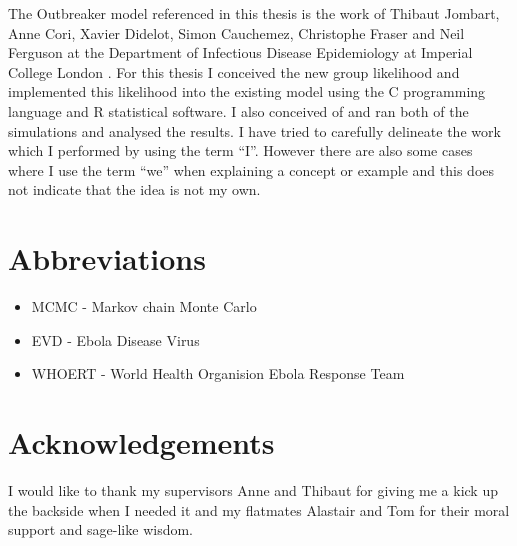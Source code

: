 \documentclass[11pt,a4paper]{report}
\begin{document}
The Outbreaker model referenced in this thesis is the work of Thibaut Jombart, Anne Cori, Xavier Didelot, Simon Cauchemez, Christophe Fraser and Neil Ferguson at the Department of Infectious Disease Epidemiology at Imperial College London \citep{outbrkr}. For this thesis I conceived the new group likelihood and implemented this likelihood into the existing model using the C programming language and R statistical software. I also conceived of and ran both of the simulations and analysed the results. I have tried to carefully delineate the work which I performed by using the term ``I''. However there are also some cases where I use the term ``we'' when explaining a concept or example and this does not indicate that the idea is not my own.
\chapter*{Abbreviations}
\begin{itemize}
\item MCMC - Markov chain Monte Carlo
\item EVD - Ebola Disease Virus
\item WHOERT - World Health Organision Ebola Response Team

\end{itemize} 
\newpage

\chapter*{Acknowledgements}
I would like to thank my supervisors Anne and Thibaut for giving me a kick up the backside when I needed it and my flatmates Alastair and Tom for their moral support and sage-like wisdom. 
\end{document}
